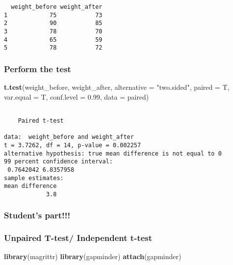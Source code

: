 \documentclass[
]{article}
\newenvironment{Shaded}{\begin{snugshade}}{\end{snugshade}}
\newcommand{\AttributeTok}[1]{\textcolor[rgb]{0.13,0.29,0.53}{#1}}
\newcommand{\FloatTok}[1]{\textcolor[rgb]{0.00,0.00,0.81}{#1}}
\newcommand{\FunctionTok}[1]{\textcolor[rgb]{0.13,0.29,0.53}{\textbf{#1}}}
\newcommand{\NormalTok}[1]{#1}
\newcommand{\StringTok}[1]{\textcolor[rgb]{0.31,0.60,0.02}{#1}}
\begin{document}
\begin{verbatim}
  weight_before weight_after
1            75           73
2            90           85
3            78           70
4            65           59
5            78           72
\end{verbatim}

\hypertarget{perform-the-test-1}{%
\subsubsection{Perform the test}\label{perform-the-test-1}}

\begin{Shaded}
\begin{Highlighting}[]
\FunctionTok{t.test}\NormalTok{(weight\_before, weight\_after, }\AttributeTok{alternative =} \StringTok{"two.sided"}\NormalTok{, }\AttributeTok{paired =}\NormalTok{ T, }\AttributeTok{var.equal =}\NormalTok{ T, }\AttributeTok{conf.level =} \FloatTok{0.99}\NormalTok{, }\AttributeTok{data =}\NormalTok{ paired)}
\end{Highlighting}
\end{Shaded}

\begin{verbatim}

    Paired t-test

data:  weight_before and weight_after
t = 3.7262, df = 14, p-value = 0.002257
alternative hypothesis: true mean difference is not equal to 0
99 percent confidence interval:
 0.7642042 6.8357958
sample estimates:
mean difference 
            3.8 
\end{verbatim}

\hypertarget{students-part}{%
\subsubsection{Student's part!!!}\label{students-part}}

\hypertarget{unpaired-t-test-independent-t-test}{%
\subsubsection{Unpaired T-test/ Independent
t-test}\label{unpaired-t-test-independent-t-test}}

\begin{Shaded}
\begin{Highlighting}[]
\FunctionTok{library}\NormalTok{(magrittr)}
\FunctionTok{library}\NormalTok{(gapminder)}
\FunctionTok{attach}\NormalTok{(gapminder)}
\end{Highlighting}
\end{Shaded}
\end{document}
